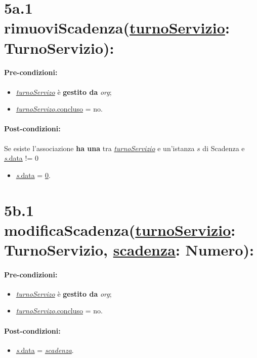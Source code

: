 \section*{5a.1 rimuoviScadenza(\underline{turnoServizio}: TurnoServizio):}

\paragraph{Pre-condizioni:}
\begin{itemize}
     \item \underline{\textit{turnoServizo}} è \textbf{gestito da} {\textit{org}};
   \item \underline{\textit{turnoServizo}.concluso} = no.
\end{itemize}

\paragraph{Post-condizioni:} Se esiste l'associazione \textbf{ha una} tra \underline{\textit{turnoServizio}} e un'istanza $s$ di Scadenza e \underline{\textit{s}.data} != 0

\begin{itemize}
    \item \underline{\textit{s}.data} = \underline{0}.
\end{itemize}

\section*{5b.1 modificaScadenza(\underline{turnoServizio}: TurnoServizio, \underline{scadenza}: Numero):}

\paragraph{Pre-condizioni:}
\begin{itemize}
     \item \underline{\textit{turnoServizo}} è \textbf{gestito da} {\textit{org}};
   \item \underline{\textit{turnoServizo}.concluso} = no.
\end{itemize}

\paragraph{Post-condizioni:}
\begin{itemize}
    \item \underline{\textit{s}.data} = \underline{\textit{scadenza}}.
\end{itemize}

